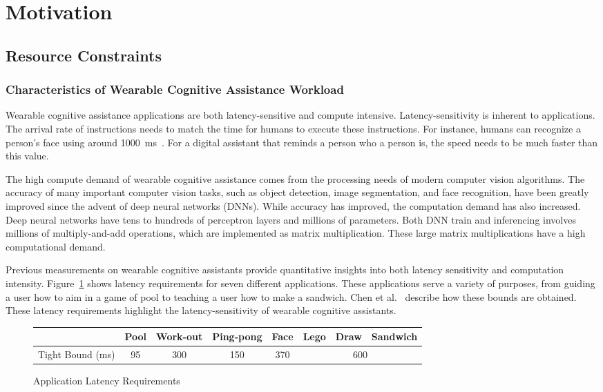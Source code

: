 \section{Motivation}

\subsection{Resource Constraints}

\subsubsection{Characteristics of Wearable Cognitive Assistance Workload}
Wearable cognitive assistance applications are both latency-sensitive and
compute intensive. Latency-sensitivity is inherent to applications. The arrival
rate of instructions needs to match the time for humans to execute these
instructions. For instance, humans can recognize a person's face using around
1000~ms~\cite{kampf2002serial}. For a digital assistant that reminds a person
who a person is, the speed needs to be much faster than this value.

The high compute demand of wearable cognitive assistance comes from the
processing needs of modern computer vision algorithms. The accuracy of many
important computer vision tasks, such as object detection, image segmentation,
and face recognition, have been greatly improved since the advent of deep neural
networks (DNNs). While accuracy has improved, the computation demand has also
increased. Deep neural networks have tens to hundreds of perceptron layers and
millions of parameters. Both DNN train and inferencing involves millions of
multiply-and-add operations, which are implemented as matrix multiplication.
These large matrix multiplications have a high computational demand.

Previous measurements on wearable cognitive assistants provide quantitative
insights into both latency sensitivity and computation intensity.
Figure~\ref{table:application-bounds} shows latency requirements for seven
different applications. These applications serve a variety of purposes, from
guiding a user how to aim in a game of pool to teaching a user how to make a
sandwich. Chen et al.~\cite{chen2017empirical} describe how these bounds are
obtained. These latency requirements highlight the latency-sensitivity of
wearable cognitive assistants.

\begin{figure}
\centering
\begin{tabular}{|l|c|c|c|c|c|c|c|}
\hline
                      & Pool & Work-out & Ping-pong & Face & Lego & Draw & Sandwich\\
\hline
    Tight Bound (ms) & 95 & 300 & 150 & 370 & \multicolumn{3}{c|}{600} \\
\hline
\end{tabular}
    \vspace{-0.0in}
    \caption{Application Latency Requirements}
\label{table:application-bounds}
\end{figure}

